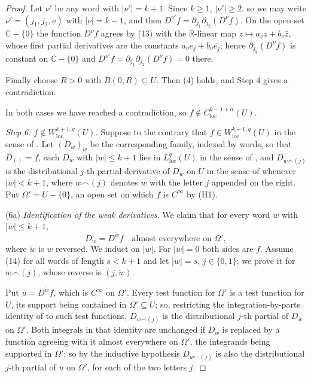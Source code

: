 \begin{proof}
Let $\nu'$ be any word with $|\nu'|=k+1$.  Since $k\ge1$, $|\nu'|\ge2$, so we
may write $\nu'=(j_1,j_2,\nu)$ with $|\nu|=k-1$, and then
$D^{\nu'}f=\partial_{j_1}\partial_{j_2}(D^\nu f)$.  On the open set
$\mathbb{C}-\{0\}$ the function $D^\nu f$ agrees by (13) with the
$\mathbb{R}$-linear map $z\mapsto a_\nu z+b_\nu\bar z$, whose first partial
derivatives are the constants $a_\nu e_{j}+b_\nu\overline{e_{j}}$; hence
$\partial_{j_2}(D^\nu f)$ is constant on $\mathbb{C}-\{0\}$ and
$D^{\nu'}f=\partial_{j_1}\partial_{j_2}(D^\nu f)=0$ there.

Finally choose $R>0$ with $\overline{B}(0,R)\subseteq U$.  Then (4) holds, and
Step 4 gives a contradiction.

In both cases we have reached a contradiction, so
$f\notin C^{k-1+\alpha}_{\mathrm{loc}}(U)$.

\emph{Step 6: $f\notin W^{k+1,q}_{\mathrm{loc}}(U)$.}  Suppose to the contrary
that $f\in W^{k+1,q}_{\mathrm{loc}}(U)$ in the sense of .
Let $(D_w)_w$ be the corresponding family, indexed by words, so that
$D_{()}=f$, each $D_w$ with $|w|\le k+1$ lies in $L^{q}_{\mathrm{loc}}(U)$ in
the sense of , and $D_{w\frown(j)}$ is the distributional
$j$-th partial derivative of $D_w$ on $U$ in the sense of
 whenever $|w|<k+1$, where $w\frown(j)$ denotes $w$
with the letter $j$ appended on the right.  Put
$\Omega'=U-\{0\}$, an open set on which $f$ is $C^\infty$ by (H1).

\noindent(6a) \emph{Identification of the weak derivatives.}  We claim that for
every word $w$ with $|w|\le k+1$,
\begin{equation}\tag{14}
  D_w=D^{\overleftarrow{w}}f\quad\text{almost everywhere on }\Omega',
\end{equation}
where $\overleftarrow{w}$ is $w$ reversed.  We induct on $|w|$.  For $|w|=0$
both sides are $f$.  Assume (14) for all words of length $s<k+1$ and let
$|w|=s$, $j\in\{0,1\}$; we prove it for $w\frown(j)$, whose reverse is
$(j,\overleftarrow{w})$.

Put $u=D^{\overleftarrow{w}}f$, which is $C^\infty$ on $\Omega'$.  Every test
function for $\Omega'$ is a test function for $U$, its support being contained
in $\Omega'\subseteq U$; so, restricting the integration-by-parts identity of
 to such test functions, $D_{w\frown(j)}$ is the
distributional $j$-th partial of $D_w$ on $\Omega'$.  Both integrals in that
identity are unchanged if $D_w$ is replaced by a function agreeing with it
almost everywhere on $\Omega'$, the integrands being supported in $\Omega'$; so
by the inductive hypothesis $D_{w\frown(j)}$ is also the distributional $j$-th
partial of $u$ on $\Omega'$, for each of the two letters $j$.


\end{proof}

